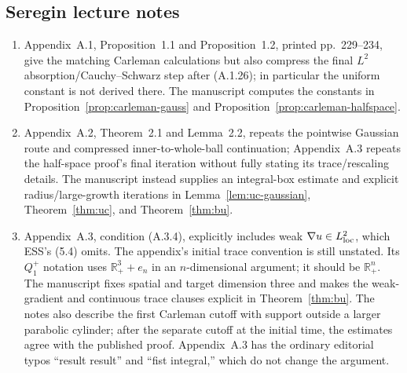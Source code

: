 \documentclass[11pt,letterpaper]{article}
\numberwithin{equation}{section}
\theoremstyle{plain}
\theoremstyle{definition}
\theoremstyle{remark}
\begin{document}
\subsection*{Seregin lecture notes}

\begin{enumerate}
\item Appendix~A.1, Proposition~1.1 and Proposition~1.2, printed pp.~229--234, give the matching Carleman calculations but also compress the final \(L^2\) absorption/Cauchy--Schwarz step after (A.1.26); in particular the uniform constant is not derived there. The manuscript computes the constants in Proposition~\ref{prop:carleman-gauss} and Proposition~\ref{prop:carleman-halfspace}.

\item Appendix~A.2, Theorem~2.1 and Lemma~2.2, repeats the pointwise Gaussian route and compressed inner-to-whole-ball continuation; Appendix~A.3 repeats the half-space proof's final iteration without fully stating its trace/rescaling details. The manuscript instead supplies an integral-box estimate and explicit radius/large-growth iterations in Lemma~\ref{lem:uc-gaussian}, Theorem~\ref{thm:uc}, and Theorem~\ref{thm:bu}.

\item Appendix~A.3, condition (A.3.4), explicitly includes weak \(\nabla u\in L^2_{\rm loc}\), which ESS's (5.4) omits. The appendix's initial trace convention is still unstated. Its \(Q_1^+\) notation uses \(\mathbb R^3_++e_n\) in an \(n\)-dimensional argument; it should be \(\mathbb R^n_+\). The manuscript fixes spatial and target dimension three and makes the weak-gradient and continuous trace clauses explicit in Theorem~\ref{thm:bu}. The notes also describe the first Carleman cutoff with support outside a larger parabolic cylinder; after the separate cutoff at the initial time, the estimates agree with the published proof. Appendix~A.3 has the ordinary editorial typos “result result” and “fist integral,” which do not change the argument.
\end{enumerate}



\end{document}
